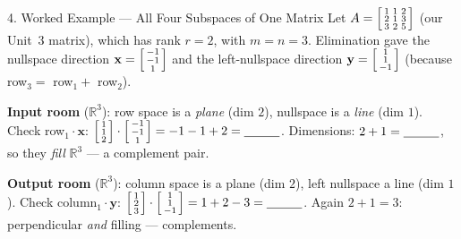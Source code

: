 \documentclass[10pt]{article}
\newcommand{\xx}{\mathbf{x}}
\newcommand{\yy}{\mathbf{y}}
\begin{document}
\begin{notesbox}{4. Worked Example --- All Four Subspaces of One Matrix}
Let $A=\begin{bsmallmatrix} 1 & 1 & 2\\ 2 & 1 & 3\\ 3 & 2 & 5 \end{bsmallmatrix}$ (our Unit~3 matrix),
which has rank $r=2$, with $m=n=3$. Elimination gave the nullspace direction
$\xx=\begin{bsmallmatrix} -1\\-1\\1 \end{bsmallmatrix}$ and the left-nullspace direction
$\yy=\begin{bsmallmatrix} 1\\1\\-1 \end{bsmallmatrix}$ (because row$_3=$ row$_1+$ row$_2$).

\vspace{2pt}
\textbf{Input room} ($\mathbb{R}^3$): row space is a \emph{plane} (dim $2$), nullspace is a
\emph{line} (dim $1$). Check row$_1\cdot\xx$:
$\begin{bsmallmatrix} 1\\1\\2 \end{bsmallmatrix}\cdot\begin{bsmallmatrix} -1\\-1\\1 \end{bsmallmatrix}
= -1-1+2=\blank{1.0cm}$. Dimensions: $2+1=\blank{1.0cm}$, so they \emph{fill} $\mathbb{R}^3$ --- a
complement pair.

\vspace{2pt}
\textbf{Output room} ($\mathbb{R}^3$): column space is a plane (dim $2$), left nullspace a line
(dim $1$). Check column$_1\cdot\yy$:
$\begin{bsmallmatrix} 1\\2\\3 \end{bsmallmatrix}\cdot\begin{bsmallmatrix} 1\\1\\-1 \end{bsmallmatrix}
= 1+2-3=\blank{1.0cm}$. Again $2+1=3$: perpendicular \emph{and} filling --- complements.
\end{notesbox}
\end{document}
